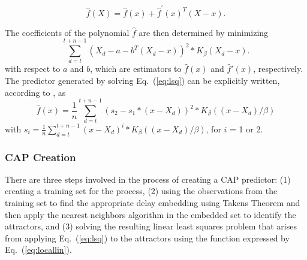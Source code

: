 \documentclass[acmtaco]{acmtrans2m}
\newcommand{\equationname}{Eq.}
\begin{document}
  \begin{equation}
    \label{eq:localtaylor}
    \hat{f}(X)=\hat{f}(x)+\hat{f}^{'}(x)^{T}(X-x).\nonumber
  \end{equation}

The coefficients of the polynomial $\hat{f}$ are then determined by minimizing
  \begin{equation}
    \label{eq:lsq}
    \displaystyle\sum_{d=t}^{t+n-1}\left(X_{d}-a-b^{T}(X_{d}-x)\right)^{2}*K_{\beta}(X_{d}-x).
  \end{equation}
 with respect to $a$ and $b$, which are estimators to
$\hat{f}(x)$ and $\hat{f}'(x)$, respectively.  The predictor generated
by solving \equationname~(\ref{eq:lsq}) can be explicitly written, according to
\cite{Box1994}, as
  \begin{equation}
    \label{eq:locallin}
    \hat{f}(x)=\frac{1}{n}\displaystyle\sum_{d=t}^{t+n-1}(s_{2}-s_{1}*(x-X_{d}))^{2}* K_{\beta}((x-X_{d})/\beta)
  \end{equation}
with $s_{i}=\frac{1}{n}\displaystyle\sum_{d=t}^{t+n-1}(x-X_{d})^{i}*K_{\beta}((x-X_{d})/\beta)$, for $i$ = 1 or 2.
\subsubsection{CAP Creation}
\label{sec:cappcreate}
There are three steps involved in the process of creating a CAP predictor:
(1) creating a training set for the process, (2) using the
observations from the training set to find the appropriate delay
embedding using Takens Theorem and then apply the nearest neighbors
algorithm in the embedded set to identify the attractors, and (3)
solving the resulting linear least squares problem that arises from
applying \equationname~(\ref{eq:lsq}) to the attractors using the
function expressed by \equationname~(\ref{eq:locallin}).
\end{document}

